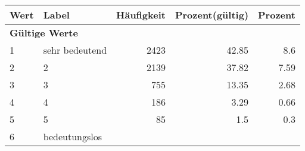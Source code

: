      \begin{longtable}{lXrrr}
     \toprule
     \textbf{Wert} & \textbf{Label} & \textbf{Häufigkeit} & \textbf{Prozent(gültig)} & \textbf{Prozent} \\
     \endhead
     \midrule
     \multicolumn{5}{l}{\textbf{Gültige Werte}}\\

     1 &
     \multicolumn{1}{X}{ sehr bedeutend   } &


       \num{2423} &
       \num[round-mode=places,round-precision=2]{42,85} &
         \num[round-mode=places,round-precision=2]{8,6} \\

     2 &
     \multicolumn{1}{X}{ 2   } &


       \num{2139} &
       \num[round-mode=places,round-precision=2]{37,82} &
         \num[round-mode=places,round-precision=2]{7,59} \\

     3 &
     \multicolumn{1}{X}{ 3   } &


       \num{755} &
       \num[round-mode=places,round-precision=2]{13,35} &
         \num[round-mode=places,round-precision=2]{2,68} \\

     4 &
     \multicolumn{1}{X}{ 4   } &


       \num{186} &
       \num[round-mode=places,round-precision=2]{3,29} &
         \num[round-mode=places,round-precision=2]{0,66} \\

     5 &
     \multicolumn{1}{X}{ 5   } &


       \num{85} &
       \num[round-mode=places,round-precision=2]{1,5} &
         \num[round-mode=places,round-precision=2]{0,3} \\

     6 &
     \multicolumn{1}{X}{ bedeutungslos   } &



\end{longtable}
